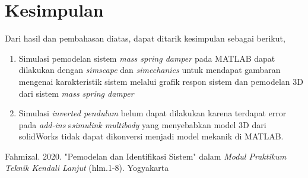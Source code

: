 \documentclass[../main.tex]{subfiles}
\begin{document}
    \section{Kesimpulan}
        Dari hasil dan pembahasan diatas, dapat ditarik kesimpulan sebagai berikut,
        \begin{enumerate}
            \item Simulasi pemodelan sistem \textit{mass spring damper} pada MATLAB dapat dilakukan dengan \textit{simscape} dan \textit{simechanics} untuk mendapat gambaran mengenai karakteristik sistem melalui grafik respon sistem dan pemodelan 3D dari sistem \textit{mass spring damper}
            \item Simulasi \textit{inverted pendulum} belum dapat dilakukan karena terdapat error pada \textit{add-ins} s\textit{simulink multibody} yang menyebabkan model 3D dari solidWorks tidak dapat dikonversi menjadi model mekanik di MATLAB. 
        \end{enumerate}
    \begin{thebibliography}{2}
         Fahmizal. 2020. "Pemodelan dan Identifikasi Sistem" dalam \textit{Modul Praktikum Teknik Kendali Lanjut} (hlm.1-8). Yogyakarta
    \end{thebibliography}
\end{document}
